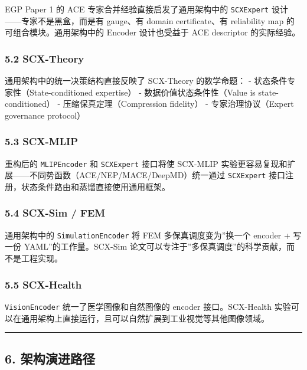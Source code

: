 \documentclass[
  12pt,
]{ctexart}
\begin{document}
EGP Paper 1 的 ACE 专家合并经验直接启发了通用架构中的 \texttt{SCXExpert}
设计------专家不是黑盒，而是有 gauge、有 domain certificate、有
reliability map 的可组合模块。通用架构中的 Encoder 设计也受益于 ACE
descriptor 的实际经验。

\subsubsection{5.2 SCX-Theory}\label{scx-theory}

通用架构中的统一决策结构直接反映了 SCX-Theory 的数学命题： -
状态条件专家性（State-conditioned expertise） -
数据价值状态条件性（Value is state-conditioned） -
压缩保真定理（Compression fidelity） - 专家治理协议（Expert governance
protocol）

\subsubsection{5.3 SCX-MLIP}\label{scx-mlip}

重构后的 \texttt{MLIPEncoder} 和 \texttt{SCXExpert} 接口将使 SCX-MLIP
实验更容易复现和扩展------不同势函数（ACE/NEP/MACE/DeepMD）统一通过
\texttt{SCXExpert} 接口注册，状态条件路由和蒸馏直接使用通用框架。

\subsubsection{5.4 SCX-Sim / FEM}\label{scx-sim-fem}

通用架构中的 \texttt{SimulationEncoder} 将 FEM 多保真调度变为''换一个
encoder + 写一份 YAML''的工作量。SCX-Sim
论文可以专注于''多保真调度''的科学贡献，而不是工程实现。

\subsubsection{5.5 SCX-Health}\label{scx-health}

\texttt{VisionEncoder} 统一了医学图像和自然图像的 encoder
接口。SCX-Health
实验可以在通用架构上直接运行，且可以自然扩展到工业视觉等其他图像领域。

\begin{center}\rule{0.5\linewidth}{0.5pt}\end{center}

\subsection{6. 架构演进路径}\label{ux67b6ux6784ux6f14ux8fdbux8defux5f84}
\end{document}
